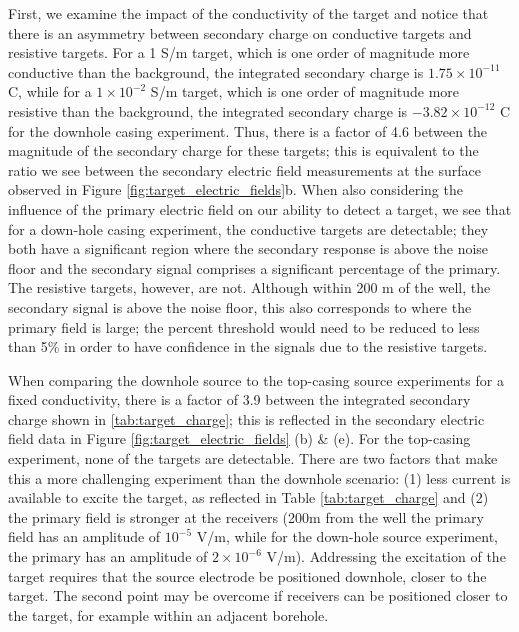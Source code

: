 \documentclass[extra,mreferee]{gji}
\begin{document}






First, we examine the impact of the conductivity of the target and notice that there is an asymmetry between secondary charge on conductive targets and resistive targets. For a 1 S/m target, which is one order of magnitude more conductive than the background, the integrated secondary charge is $1.75 \times 10^{-11}$ C, while for a $1\times10^{-2}$ S/m target, which is one order of magnitude more resistive than the background, the integrated secondary charge is $-3.82 \times 10^{-12}$ C for the downhole casing experiment. Thus, there is a factor of 4.6 between the magnitude of the secondary charge for these targets; this is equivalent to the ratio we see between the secondary electric field measurements at the surface observed in Figure \ref{fig:target_electric_fields}b. When also considering the influence of the primary electric field on our ability to detect a target, we see that for a down-hole casing experiment, the conductive targets are detectable; they both have a significant region where the secondary response is above the noise floor and the secondary signal comprises a significant percentage of the primary. The resistive targets, however, are not. Although within 200 m of the well, the secondary signal is above the noise floor, this also corresponds to where the primary field is large; the percent threshold would need to be reduced to less than 5\% in order to have confidence in the signals due to the resistive targets.

When comparing the downhole source to the top-casing source experiments for a fixed conductivity, there is a factor of 3.9 between the integrated secondary charge shown in \ref{tab:target_charge}; this is reflected in the secondary electric field data in Figure \ref{fig:target_electric_fields} (b) \& (e).  For the top-casing experiment, none of the targets are detectable. There are two factors that make this a more challenging experiment than the downhole scenario: (1) less current is available to excite the target, as reflected in Table \ref{tab:target_charge} and (2) the primary field is stronger at the receivers (200m from the well the primary field has an amplitude of $10^{-5}$ V/m, while for the down-hole source experiment, the primary has an amplitude of $2 \times 10^{-6}$ V/m). Addressing the excitation of the target requires that the source electrode be positioned downhole, closer to the target. The second point may be overcome if receivers can be positioned closer to the target, for example within an adjacent borehole.
\end{document}
